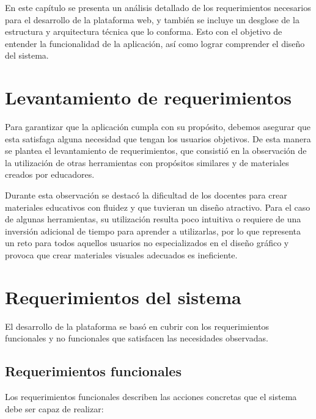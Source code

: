 \documentclass[12pt,a4paper]{report}
\begin{document}
En este capítulo se presenta un análisis detallado de los requerimientos necesarios para el desarrollo de la plataforma web, y también se incluye un desglose de la estructura y arquitectura técnica que lo conforma. Esto con el objetivo de entender la funcionalidad de la aplicación, así como lograr comprender el diseño del sistema.

\section{Levantamiento de requerimientos}

Para garantizar que la aplicación cumpla con su propósito, debemos asegurar que esta satisfaga alguna necesidad que tengan los usuarios objetivos. De esta manera se plantea el levantamiento de requerimientos, que consistió en la observación de la utilización de otras herramientas con propósitos similares y de materiales creados por educadores.

Durante esta observación se destacó la dificultad de los docentes para crear materiales educativos con fluidez y que tuvieran un diseño atractivo. Para el caso de algunas herramientas, su utilización resulta poco intuitiva o requiere de una inversión adicional de tiempo para aprender a utilizarlas, por lo que representa un reto para todos aquellos usuarios no especializados en el diseño gráfico y provoca que crear materiales visuales adecuados es ineficiente.

\section{Requerimientos del sistema}

El desarrollo de la plataforma se basó en cubrir con los requerimientos funcionales y no funcionales que satisfacen las necesidades observadas.

\subsection{Requerimientos funcionales}

Los requerimientos funcionales describen las acciones concretas que el sistema debe ser capaz de realizar:
\end{document}
